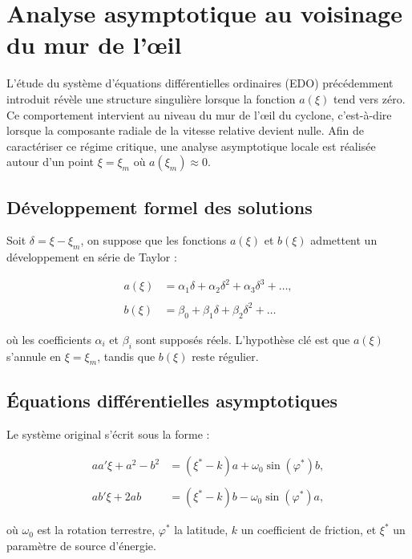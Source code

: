 
\chapter{Analyse asymptotique au voisinage du mur de l’œil}

L’étude du système d’équations différentielles ordinaires (EDO) précédemment introduit révèle une structure singulière lorsque la fonction $a(\xi)$ tend vers zéro. Ce comportement intervient au niveau du mur de l’œil du cyclone, c’est-à-dire lorsque la composante radiale de la vitesse relative devient nulle. Afin de caractériser ce régime critique, une analyse asymptotique locale est réalisée autour d’un point $\xi = \xi_m$ où $a(\xi_m) \approx 0$.

\section{Développement formel des solutions}

Soit $\delta = \xi - \xi_m$, on suppose que les fonctions $a(\xi)$ et $b(\xi)$ admettent un développement en série de Taylor :

\[
\begin{aligned}
a(\xi) &= \alpha_1 \delta + \alpha_2 \delta^2 + \alpha_3 \delta^3 + \dots, \\\\
b(\xi) &= \beta_0 + \beta_1 \delta + \beta_2 \delta^2 + \dots
\end{aligned}
\]

où les coefficients $\alpha_i$ et $\beta_i$ sont supposés réels. L’hypothèse clé est que $a(\xi)$ s’annule en $\xi = \xi_m$, tandis que $b(\xi)$ reste régulier.

\section{Équations différentielles asymptotiques}

Le système original s’écrit sous la forme :

\[
\begin{aligned}
a a' \xi + a^2 - b^2 &= (\xi^* - k) a + \omega_0 \sin(\varphi^*) b, \\\\
a b' \xi + 2 a b &= (\xi^* - k) b - \omega_0 \sin(\varphi^*) a,
\end{aligned}
\]

où $\omega_0$ est la rotation terrestre, $\varphi^*$ la latitude, $k$ un coefficient de friction, et $\xi^*$ un paramètre de source d’énergie.

